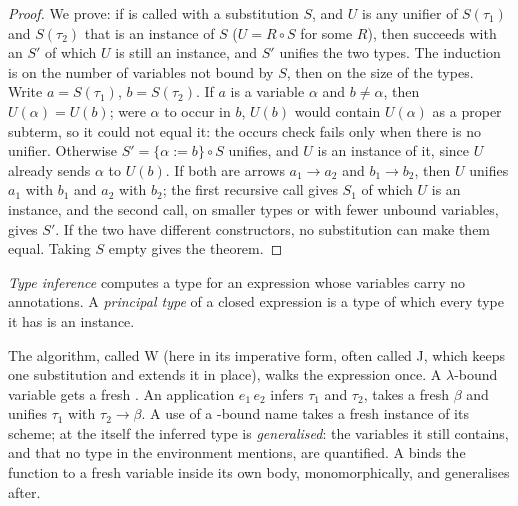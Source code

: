 \begin{proof}
We prove: if  is called with a substitution $S$, and $U$ is any unifier of $S(\tau_1)$ and $S(\tau_2)$ that is an instance of $S$ ($U = R \circ S$ for some $R$), then  succeeds with an $S'$ of which $U$ is still an instance, and $S'$ unifies the two types. The induction is on the number of variables not bound by $S$, then on the size of the types. Write $a = S(\tau_1)$, $b = S(\tau_2)$. If $a$ is a variable $\alpha$ and $b \ne \alpha$, then $U(\alpha) = U(b)$; were $\alpha$ to occur in $b$, $U(b)$ would contain $U(\alpha)$ as a proper subterm, so it could not equal it: the occurs check fails only when there is no unifier. Otherwise $S' = \{\alpha := b\} \circ S$ unifies, and $U$ is an instance of it, since $U$ already sends $\alpha$ to $U(b)$. If both are arrows $a_1 \to a_2$ and $b_1 \to b_2$, then $U$ unifies $a_1$ with $b_1$ and $a_2$ with $b_2$; the first recursive call gives $S_1$ of which $U$ is an instance, and the second call, on smaller types or with fewer unbound variables, gives $S'$. If the two have different constructors, no substitution can make them equal. Taking $S$ empty gives the theorem.
\end{proof}

\begin{definition}\label{def:b3:type-systems:inference}
\emph{Type inference} computes a type for an expression whose variables carry no annotations. A \emph{principal type} of a closed expression is a type of which every type it has is an instance.
\end{definition}

The algorithm, called W (here in its imperative form, often called J, which keeps one substitution and extends it in place), walks the expression once. A $\lambda$-bound variable gets a fresh . An application $e_1\,e_2$ infers $\tau_1$ and $\tau_2$, takes a fresh $\beta$ and unifies $\tau_1$ with $\tau_2 \to \beta$. A use of a -bound name takes a fresh instance of its scheme; at the  itself the inferred type is \emph{generalised}: the variables it still contains, and that no type in the environment mentions, are quantified. A  binds the function to a fresh variable inside its own body, monomorphically, and generalises after.

\label{lst:b3:type-systems:gen}

